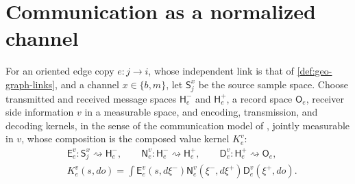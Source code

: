 \section{Communication as a normalized channel}
\label{sec:selective-kernels}

For an oriented edge copy \(e:j\to i\), whose independent link is that of
\cref{def:geo-graph-links}, and a channel \(x\in\{b,m\}\), let
\(\mathsf S_j^x\) be the source sample space. Choose transmitted and received
message spaces \(\mathsf H_e^-\) and \(\mathsf H_e^+\), a record space
\(\mathsf O_e\), receiver side information \(v\) in a measurable space, and
encoding, transmission, and decoding kernels, in the sense of the
communication model of \citet{Shannon1948}, jointly measurable in \(v\), whose
composition is the composed value kernel \(K_e^v\):
\begin{align}
&\mathsf E_e^v:\mathsf S_j^x\rightsquigarrow\mathsf H_e^-,
\qquad \mathsf N_e^v:\mathsf H_e^-\rightsquigarrow\mathsf H_e^+,
\qquad \mathsf D_e^v:\mathsf H_e^+\rightsquigarrow\mathsf O_e,
\label{eq:obs-selective-kernel-types}\\
&K_e^v(s,do)=\int\mathsf E_e^v(s,d\xi^-)
\mathsf N_e^v(\xi^-,d\xi^+)\mathsf D_e^v(\xi^+,do).
\label{eq:obs-selective-kernel-composition}
\end{align}

